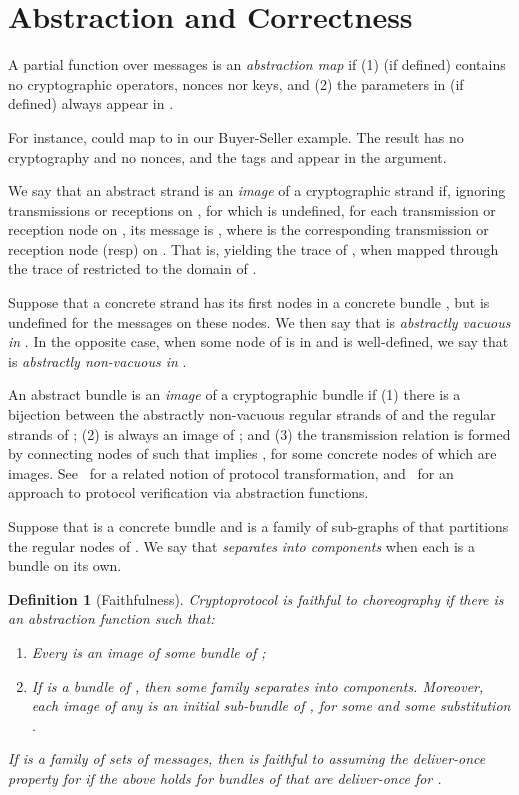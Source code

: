 \documentclass[copyright]{eptcs}
\newtheorem{definition}{Definition}
\begin{document}
\section{Abstraction and Correctness} A partial function  over
messages is an \emph{abstraction map} if (1)  (if defined)
contains no cryptographic operators, nonces nor keys, and (2) the
parameters in  (if defined) always appear in .

For instance,  could map  to
 in our Buyer-Seller
example.  The result has no cryptography and no nonces, and the tags
 and  appear in the argument.  

We say that an abstract strand  is an \emph{image} of a
cryptographic strand  if, ignoring transmissions or receptions on
, for which  is undefined, for each transmission or
reception node  on , its message  is
, where  is the corresponding transmission or
reception node (resp) on .  That is,  yielding the trace
of , when mapped through the trace of  restricted to the
domain of .

Suppose that a concrete strand  has its first  nodes in a
concrete bundle , but  is undefined for the messages on
these nodes.  We then say that  is \emph{abstractly vacuous in}
.  In the opposite case, when some node  of  is in
 and  is well-defined, we say that  is
\emph{abstractly non-vacuous in} .

An abstract bundle  is an \emph{image} of a cryptographic bundle
 if (1) there is a bijection  between the abstractly
non-vacuous regular strands  of  and the regular strands
 of ; (2)  is always an image of ; and (3)
the transmission relation  is formed by connecting
nodes of  such that  implies
, for some concrete nodes of which  are
images.  See~\cite{Guttman09a} for a related notion of protocol
transformation, and~\cite{MaffeiEtAl07} for an approach to protocol
verification via abstraction functions.

Suppose that  is a concrete bundle and  is a
family of sub-graphs of  that partitions the regular nodes of
.  We say that  \emph{separates} 
\emph{into components} when each  is a bundle on its own.

\begin{definition}[Faithfulness] \label{def:faithful}
Cryptoprotocol  is \emph{faithful to} choreography  if there
is an abstraction function  such that:
\begin{enumerate}
  \item Every  is an image of some bundle 
  of ;\label{clause:fth:upward:cover}
  \item If  is a bundle of , then some family
   separates  into components.  Moreover, each
  image  of any  is an initial sub-bundle of
  , for some  and some substitution
  .\label{clause:fth:downward:separate}
\end{enumerate}
If  is a family of sets of messages, then  is
\emph{faithful to}  \emph{assuming the deliver-once property for}
 if the above holds for bundles of  that are
deliver-once for .
\end{definition}
\end{document}
